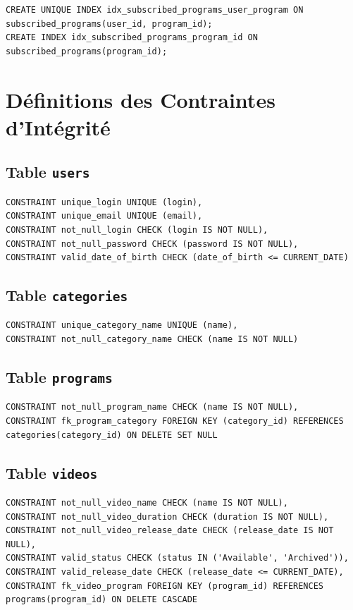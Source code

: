 \documentclass[a4paper,12pt]{article}
\begin{document}
\begin{lstlisting}
CREATE UNIQUE INDEX idx_subscribed_programs_user_program ON subscribed_programs(user_id, program_id);
CREATE INDEX idx_subscribed_programs_program_id ON subscribed_programs(program_id);
\end{lstlisting}

\section{Définitions des Contraintes d'Intégrité}

\subsection{Table \texttt{users}}

\begin{lstlisting}
CONSTRAINT unique_login UNIQUE (login),
CONSTRAINT unique_email UNIQUE (email),
CONSTRAINT not_null_login CHECK (login IS NOT NULL),
CONSTRAINT not_null_password CHECK (password IS NOT NULL),
CONSTRAINT valid_date_of_birth CHECK (date_of_birth <= CURRENT_DATE)
\end{lstlisting}

\subsection{Table \texttt{categories}}

\begin{lstlisting}
CONSTRAINT unique_category_name UNIQUE (name),
CONSTRAINT not_null_category_name CHECK (name IS NOT NULL)
\end{lstlisting}

\subsection{Table \texttt{programs}}

\begin{lstlisting}
CONSTRAINT not_null_program_name CHECK (name IS NOT NULL),
CONSTRAINT fk_program_category FOREIGN KEY (category_id) REFERENCES categories(category_id) ON DELETE SET NULL
\end{lstlisting}

\subsection{Table \texttt{videos}}

\begin{lstlisting}
CONSTRAINT not_null_video_name CHECK (name IS NOT NULL),
CONSTRAINT not_null_video_duration CHECK (duration IS NOT NULL),
CONSTRAINT not_null_video_release_date CHECK (release_date IS NOT NULL),
CONSTRAINT valid_status CHECK (status IN ('Available', 'Archived')),
CONSTRAINT valid_release_date CHECK (release_date <= CURRENT_DATE),
CONSTRAINT fk_video_program FOREIGN KEY (program_id) REFERENCES programs(program_id) ON DELETE CASCADE
\end{lstlisting}
\end{document}
